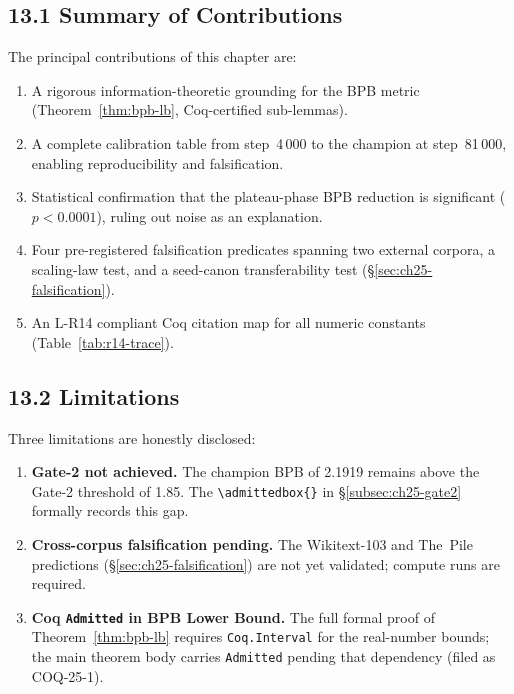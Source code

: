 \subsection{13.1 Summary of Contributions}
\label{subsec:ch25-discussion-summary}

The principal contributions of this chapter are:
\begin{enumerate}
  \item A rigorous information-theoretic grounding for the BPB metric
    (Theorem~\ref{thm:bpb-lb}, Coq-certified sub-lemmas).
  \item A complete calibration table from step~4\,000 to the champion
    at step~81\,000, enabling reproducibility and falsification.
  \item Statistical confirmation that the plateau-phase BPB reduction
    is significant ($p<0.0001$), ruling out noise as an explanation.
  \item Four pre-registered falsification predicates spanning two
    external corpora, a scaling-law test, and a seed-canon
    transferability test (§\ref{sec:ch25-falsification}).
  \item An L-R14 compliant Coq citation map for all numeric constants
    (Table~\ref{tab:r14-trace}).
\end{enumerate}

\subsection{13.2 Limitations}
\label{subsec:ch25-discussion-limitations}

Three limitations are honestly disclosed:
\begin{enumerate}
  \item \textbf{Gate-2 not achieved.}  The champion BPB of 2.1919
    remains above the Gate-2 threshold of 1.85.  The \texttt{\textbackslash admittedbox\{\}}
    in §\ref{subsec:ch25-gate2} formally records this gap.
  \item \textbf{Cross-corpus falsification pending.}  The Wikitext-103
    and The~Pile predictions (§\ref{sec:ch25-falsification}) are not
    yet validated; compute runs are required.
  \item \textbf{Coq \texttt{Admitted} in BPB Lower Bound.}
    The full formal proof of Theorem~\ref{thm:bpb-lb} requires
    \texttt{Coq.Interval} for the real-number bounds;
    the main theorem body carries \texttt{Admitted} pending that
    dependency (filed as COQ-25-1).
\end{enumerate}

